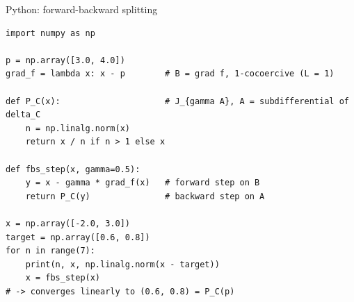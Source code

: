 \documentclass[aspectratio=169,10pt]{beamer}
\begin{document}
\begin{frame}[fragile]{Python: forward-backward splitting}
\begin{lstlisting}
import numpy as np

p = np.array([3.0, 4.0])
grad_f = lambda x: x - p        # B = grad f, 1-cocoercive (L = 1)

def P_C(x):                     # J_{gamma A}, A = subdifferential of delta_C
    n = np.linalg.norm(x)
    return x / n if n > 1 else x

def fbs_step(x, gamma=0.5):
    y = x - gamma * grad_f(x)   # forward step on B
    return P_C(y)               # backward step on A

x = np.array([-2.0, 3.0])
target = np.array([0.6, 0.8])
for n in range(7):
    print(n, x, np.linalg.norm(x - target))
    x = fbs_step(x)
# -> converges linearly to (0.6, 0.8) = P_C(p)
\end{lstlisting}
\end{frame}
\end{document}
